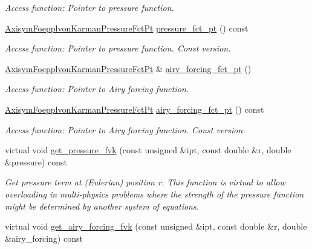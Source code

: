 \begin{DoxyCompactItemize}
\begin{DoxyCompactList}\small\item\em Access function\+: Pointer to pressure function. \end{DoxyCompactList}\item 
\hyperlink{classoomph_1_1AxisymFoepplvonKarmanEquations_a504878b18d793ef8a6540eb0f2b086c8}{Axisym\+Foepplvon\+Karman\+Pressure\+Fct\+Pt} \hyperlink{classoomph_1_1AxisymFoepplvonKarmanEquations_a02dd3dab84e6492d88fdd144a2eed64b}{pressure\+\_\+fct\+\_\+pt} () const
\begin{DoxyCompactList}\small\item\em Access function\+: Pointer to pressure function. Const version. \end{DoxyCompactList}\item 
\hyperlink{classoomph_1_1AxisymFoepplvonKarmanEquations_a504878b18d793ef8a6540eb0f2b086c8}{Axisym\+Foepplvon\+Karman\+Pressure\+Fct\+Pt} \& \hyperlink{classoomph_1_1AxisymFoepplvonKarmanEquations_a644b70b3796d567b158d8708b811a601}{airy\+\_\+forcing\+\_\+fct\+\_\+pt} ()
\begin{DoxyCompactList}\small\item\em Access function\+: Pointer to Airy forcing function. \end{DoxyCompactList}\item 
\hyperlink{classoomph_1_1AxisymFoepplvonKarmanEquations_a504878b18d793ef8a6540eb0f2b086c8}{Axisym\+Foepplvon\+Karman\+Pressure\+Fct\+Pt} \hyperlink{classoomph_1_1AxisymFoepplvonKarmanEquations_af38f42d03989cb589ad127b2ccbc7ae8}{airy\+\_\+forcing\+\_\+fct\+\_\+pt} () const
\begin{DoxyCompactList}\small\item\em Access function\+: Pointer to Airy forcing function. Const version. \end{DoxyCompactList}\item 
virtual void \hyperlink{classoomph_1_1AxisymFoepplvonKarmanEquations_acadd8cb7ef617690c79c0c76d7ed0000}{get\+\_\+pressure\+\_\+fvk} (const unsigned \&ipt, const double \&r, double \&pressure) const
\begin{DoxyCompactList}\small\item\em Get pressure term at (Eulerian) position r. This function is virtual to allow overloading in multi-\/physics problems where the strength of the pressure function might be determined by another system of equations. \end{DoxyCompactList}\item 
virtual void \hyperlink{classoomph_1_1AxisymFoepplvonKarmanEquations_aecb0dc1f5c1da058c7519ed64f2748c1}{get\+\_\+airy\+\_\+forcing\+\_\+fvk} (const unsigned \&ipt, const double \&r, double \&airy\+\_\+forcing) const

\end{DoxyCompactItemize}
